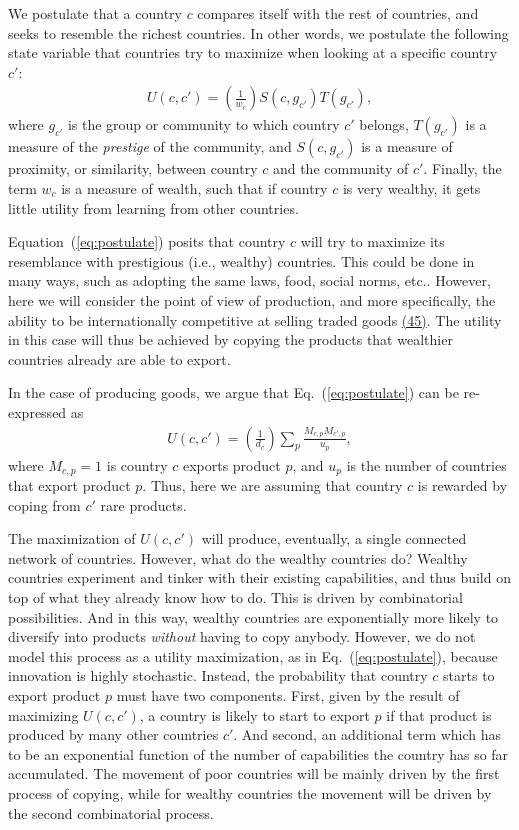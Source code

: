 \documentclass{pnastwo}
\begin{document}
\begin{article}
We postulate that a country $c$ compares itself with the rest of countries, and seeks to resemble the richest countries. In other words, we postulate the following state variable that countries try to maximize when looking at a specific country $c'$:
\begin{align}
    U(c, c')=\left(\frac{1}{w_c}\right)S(c, g_{c'})T(g_{c'}),
\label{eq:postulate}
\end{align}
where $g_{c'}$ is the group or community to which country $c'$ belongs, $T(g_{c'})$ is a measure of the \emph{prestige} of the community, and $S(c, g_{c'})$ is a measure of proximity, or similarity, between country $c$ and the community of $c'$. Finally, the term $w_c$ is a measure of wealth, such that if country $c$ is very wealthy, it gets little utility from learning from other countries.

Equation~(\ref{eq:postulate}) posits that country $c$ will try to maximize its resemblance with prestigious (i.e., wealthy) countries. This could be done in many ways, such as adopting the same laws, food, social norms, etc.. However, here we will consider the point of view of production, and more specifically, the ability to be internationally competitive at selling traded goods \hyperref[csl:45]{(45)}. The utility in this case will thus be achieved by copying the products that wealthier countries already are able to export.

In the case of producing goods, we argue that Eq.~(\ref{eq:postulate}) can be re-expressed as
\begin{align}
    U(c, c')=\left(\frac{1}{d_c}\right)\sum_p \frac{M_{c,p}M_{c',p}}{u_p},
\label{eq:diversificationutility}
\end{align}
where $M_{c,p}=1$ is country $c$ exports product $p$, and $u_p$ is the number of countries that export product $p$. Thus, here we are assuming that country $c$ is rewarded by coping from $c'$ rare products.

The maximization of $U(c, c')$ will produce, eventually, a single connected network of countries. However, what do the wealthy countries do? Wealthy countries experiment and tinker with their existing capabilities, and thus build on top of what they already know how to do. This is driven by combinatorial possibilities. And in this way, wealthy countries are exponentially more likely to diversify into products \emph{without} having to copy anybody. However, we do not model this process as a utility maximization, as in Eq.~(\ref{eq:postulate}), because innovation is highly stochastic. Instead, the probability that country $c$ starts to export product $p$ must have two components. First, given by the result of maximizing $U(c, c')$, a country is likely to start to export $p$ if that product is produced by many other countries $c'$. And second, an additional term which has to be an exponential function of the number of capabilities the country has so far accumulated. The movement of poor countries will be mainly driven by the first process of copying, while for wealthy countries the movement will be driven by the second combinatorial process.


\end{article}
\end{document}
